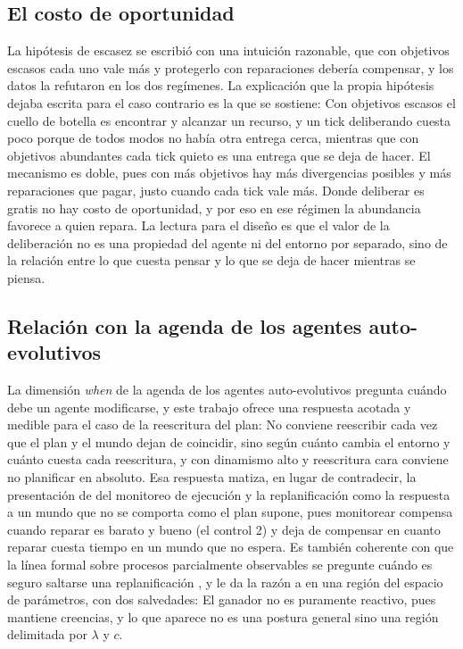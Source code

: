 \subsection{El costo de oportunidad}\label{sec:disc-oportunidad}

La hipótesis de escasez se escribió con una intuición razonable, que con objetivos escasos cada uno vale más y protegerlo con reparaciones debería compensar, y los datos la refutaron en los dos regímenes. La explicación que la propia hipótesis dejaba escrita para el caso contrario es la que se sostiene: Con objetivos escasos el cuello de botella es encontrar y alcanzar un recurso, y un tick deliberando cuesta poco porque de todos modos no había otra entrega cerca, mientras que con objetivos abundantes cada tick quieto es una entrega que se deja de hacer. El mecanismo es doble, pues con más objetivos hay más divergencias posibles y más reparaciones que pagar, justo cuando cada tick vale más. Donde deliberar es gratis no hay costo de oportunidad, y por eso en ese régimen la abundancia favorece a quien repara. La lectura para el diseño es que el valor de la deliberación no es una propiedad del agente ni del entorno por separado, sino de la relación entre lo que cuesta pensar y lo que se deja de hacer mientras se piensa.

\subsection{Relación con la agenda de los agentes auto-evolutivos}

La dimensión \emph{when} de la agenda de los agentes auto-evolutivos \parencite{gao2026selfevolving} pregunta cuándo debe un agente modificarse, y este trabajo ofrece una respuesta acotada y medible para el caso de la reescritura del plan: No conviene reescribir cada vez que el plan y el mundo dejan de coincidir, sino según cuánto cambia el entorno y cuánto cuesta cada reescritura, y con dinamismo alto y reescritura cara conviene no planificar en absoluto. Esa respuesta matiza, en lugar de contradecir, la presentación de \textcite[§11.5]{russellNorvig2020} del monitoreo de ejecución y la replanificación como la respuesta a un mundo que no se comporta como el plan supone, pues monitorear compensa cuando reparar es barato y bueno (el control 2) y deja de compensar en cuanto reparar cuesta tiempo en un mundo que no espera. Es también coherente con que la línea formal sobre procesos parcialmente observables se pregunte cuándo es seguro saltarse una replanificación \parencite{kong2026open}, y le da la razón a \textcite{brooks1991intelligence} en una región del espacio de parámetros, con dos salvedades: El ganador no es puramente reactivo, pues mantiene creencias, y lo que aparece no es una postura general sino una región delimitada por $\lambda$ y $c$.


